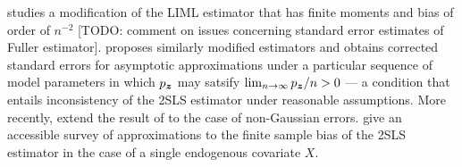 \documentclass{uwstat572}
\numberwithin{equation}{section}
\begin{document}
\cite{F77} studies a modification of the LIML estimator that has finite moments and bias of order of $n^{-2}$ [TODO: comment on issues concerning standard error estimates of Fuller estimator]. \cite{B94} proposes similarly modified estimators and obtains corrected standard errors for asymptotic approximations under a particular sequence of model parameters in which ${p_{\boldsymbol{z}}}$ may satsify $\lim_{n\to\infty} {p_{\boldsymbol{z}}}/n > 0$ --- a condition that entails inconsistency of the 2SLS estimator under reasonable assumptions. More recently, \cite{HHN08} extend the result of \cite{B94} to the case of non-Gaussian errors. \cite{BW11} give an accessible survey of approximations to the finite sample bias of the 2SLS estimator in the case of a single endogenous covariate $X$. 
\end{document}
